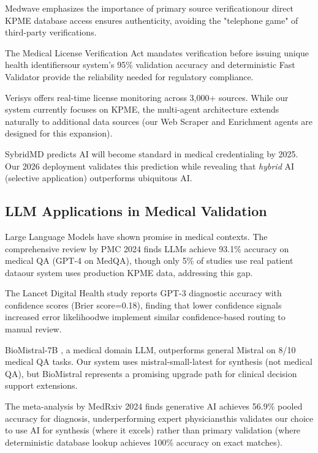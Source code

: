 \documentclass[conference]{IEEEtran}
\begin{document}
Medwave \cite{medwave2024credentialing} emphasizes the importance of primary source verificationour direct KPME database access ensures authenticity, avoiding the "telephone game" of third-party verifications.

The Medical License Verification Act \cite{congress2024mlva} mandates verification before issuing unique health identifiersour system's 95\% validation accuracy and deterministic Fast Validator provide the reliability needed for regulatory compliance.

Verisys \cite{verisys2024monitoring} offers real-time license monitoring across 3,000+ sources. While our system currently focuses on KPME, the multi-agent architecture extends naturally to additional data sources (our Web Scraper and Enrichment agents are designed for this expansion).

SybridMD \cite{sybridmd2023future} predicts AI will become standard in medical credentialing by 2025. Our 2026 deployment validates this prediction while revealing that \textit{hybrid} AI (selective application) outperforms ubiquitous AI.

\subsection{LLM Applications in Medical Validation}

Large Language Models have shown promise in medical contexts. The comprehensive review by PMC 2024 \cite{pmc2024llmhealthcare} finds LLMs achieve 93.1\% accuracy on medical QA (GPT-4 on MedQA), though only 5\% of studies use real patient dataour system uses production KPME data, addressing this gap.

The Lancet Digital Health study \cite{lancet2024gpt3} reports GPT-3 diagnostic accuracy with confidence scores (Brier score=0.18), finding that lower confidence signals increased error likelihoodwe implement similar confidence-based routing to manual review.

BioMistral-7B \cite{biomistral2024}, a medical domain LLM, outperforms general Mistral on 8/10 medical QA tasks. Our system uses mistral-small-latest for synthesis (not medical QA), but BioMistral represents a promising upgrade path for clinical decision support extensions.

The meta-analysis by MedRxiv 2024 \cite{medrxiv2024diagnostic} finds generative AI achieves 56.9\% pooled accuracy for diagnosis, underperforming expert physiciansthis validates our choice to use AI for synthesis (where it excels) rather than primary validation (where deterministic database lookup achieves 100\% accuracy on exact matches).
\end{document}
